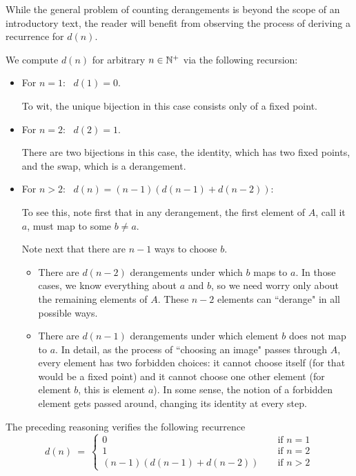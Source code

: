 \smallskip

While the general problem of counting derangements is beyond the scope of an introductory text, the reader will benefit from observing the process of deriving a recurrence for $d(n)$.  

\medskip

We compute $d(n)$ for arbitrary $n \in \mathbb{N}^+$ via the following recursion:
\begin{itemize}
\item
For $n=1$:  \ $d(1) = 0$.

\smallskip

To wit, the unique bijection in this case consists only of a fixed point. 

\medskip\item
For $n=2$:  \ $d(2) = 1$.

\smallskip

There are two bijections in this case, the identity, which has two fixed points, and the swap,
which is a derangement.

\medskip\item
For $n > 2$: \ $d(n) = (n-1) (d(n-1) + d(n-2))$:

\smallskip

To see this, note first that in any derangement, the first element of $A$, call it $a$, must map to some $b \neq a$.

\smallskip

Note next that there are $n-1$ ways to choose $b$.
  \begin{itemize}
  \item
There are $d(n-2)$ derangements under which $b$ maps to $a$.  In those cases, we know everything about $a$ and $b$, so we need worry only about the remaining elements of $A$.  These $n-2$ elements can ``derange" in all possible ways.

  \medskip\item
There are $d(n-1)$ derangements under which element $b$ does not map to $a$.  In detail,
as the process of ``choosing an image" passes through $A$, every element has two forbidden
choices: it cannot choose itself (for that would be a fixed point) and it cannot choose one other
element (for element $b$, this is element $a$).  In some sense, the notion of a forbidden element gets passed around, changing its identity at every step.
  \end{itemize}
\end{itemize}
The preceding reasoning verifies the following recurrence
\[
d(n) \ = \ \left\{
\begin{array}{ccl}
0 &  & \mbox{ if } n=1 \\
1 &  & \mbox{ if } n= 2 \\
(n-1) (d(n-1) + d(n-2)) &  & \mbox{ if } n> 2
\end{array}
\right. 
\]

